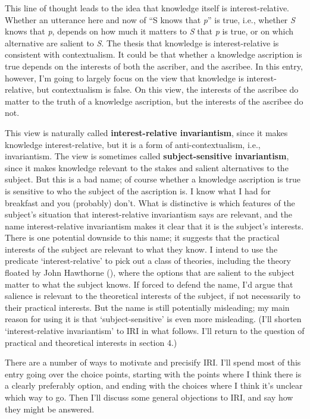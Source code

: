 \documentclass[
  10pt,
  letterpaper,
  DIV=11,
  numbers=noendperiod,
  twoside]{scrartcl}
\begin{document}
This line of thought leads to the idea that knowledge itself is
interest-relative. Whether an utterance here and now of ``S knows that
\emph{p}'' is true, i.e., whether \emph{S} knows that \emph{p}, depends
on how much it matters to \emph{S} that \emph{p} is true, or on which
alternative are salient to \emph{S}. The thesis that knowledge is
interest-relative is consistent with contextualism. It could be that
whether a knowledge ascription is true depends on the interests of both
the ascriber, and the ascribee. In this entry, however, I'm going to
largely focus on the view that knowledge is interest-relative, but
contextualism is false. On this view, the interests of the ascribee do
matter to the truth of a knowledge ascription, but the interests of the
ascribee do not.

This view is naturally called \textbf{interest-relative invariantism},
since it makes knowledge interest-relative, but it is a form of
anti-contextualism, i.e., invariantism. The view is sometimes called
\textbf{subject-sensitive invariantism}, since it makes knowledge
relevant to the stakes and salient alternatives to the subject. But this
is a bad name; of course whether a knowledge ascription is true is
sensitive to who the subject of the ascription is. I know what I had for
breakfast and you (probably) don't. What is distinctive is which
features of the subject's situation that interest-relative invariantism
says are relevant, and the name interest-relative invariantism makes it
clear that it is the subject's interests. There is one potential
downside to this name; it suggests that the practical interests of the
subject are relevant to what they know. I intend to use the predicate
`interest-relative' to pick out a class of theories, including the
theory floated by John Hawthorne (),
where the options that are salient to the subject matter to what the
subject knows. If forced to defend the name, I'd argue that salience is
relevant to the theoretical interests of the subject, if not necessarily
to their practical interests. But the name is still potentially
misleading; my main reason for using it is that `subject-sensitive' is
even more misleading. (I'll shorten `interest-relative invariantism' to
IRI in what follows. I'll return to the question of practical and
theoretical interests in section 4.)

There are a number of ways to motivate and precisify IRI. I'll spend
most of this entry going over the choice points, starting with the
points where I think there is a clearly preferably option, and ending
with the choices where I think it's unclear which way to go. Then I'll
discuss some general objections to IRI, and say how they might be
answered.
\end{document}
